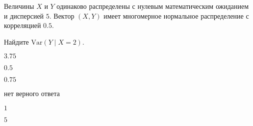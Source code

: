 
\begin{question}
Величины \(X\) и \(Y\) одинаково распределены с нулевым математическим
ожиданием и дисперсией \(5\). Вектор \((X, Y)\) имеет многомерное
нормальное распределение с корреляцией \(0.5\).

Найдите \(\mathrm{Var}(Y\mid X = 2)\).
\begin{answerlist}
  \item \(3.75\)
  \item \(0.5\)
  \item \(0.75\)
  \item нет верного ответа
  \item \(1\)
  \item \(5\)
\end{answerlist}
\end{question}


